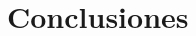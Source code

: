 \documentclass[a4paper,10pt,twocolumn]{article}
\begin{document}
  	



\section{Conclusiones}\label{sec:conc}








\begin{thebibliography}{99}

\end{thebibliography}


\label{end}
\end{document}
